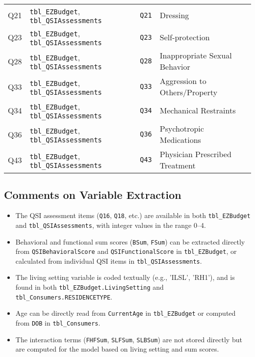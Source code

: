 \begin{center}
\begin{tabular}{|l|l|l|l|}
Q21             & \texttt{tbl\_EZBudget}, \texttt{tbl\_QSIAssessments} & \texttt{Q21}  & Dressing \\
Q23             & \texttt{tbl\_EZBudget}, \texttt{tbl\_QSIAssessments} & \texttt{Q23}  & Self-protection \\
Q28             & \texttt{tbl\_EZBudget}, \texttt{tbl\_QSIAssessments} & \texttt{Q28}  & Inappropriate Sexual Behavior \\
Q33             & \texttt{tbl\_EZBudget}, \texttt{tbl\_QSIAssessments} & \texttt{Q33}  & Aggression to Others/Property \\
Q34             & \texttt{tbl\_EZBudget}, \texttt{tbl\_QSIAssessments} & \texttt{Q34}  & Mechanical Restraints \\
Q36             & \texttt{tbl\_EZBudget}, \texttt{tbl\_QSIAssessments} & \texttt{Q36}  & Psychotropic Medications \\
Q43             & \texttt{tbl\_EZBudget}, \texttt{tbl\_QSIAssessments} & \texttt{Q43}  & Physician Prescribed Treatment \\
\hline
\end{tabular}
\end{center}

\subsection{Comments on Variable Extraction}

\begin{itemize}
    \item The QSI assessment items (\texttt{Q16}, \texttt{Q18}, etc.) are available in both \texttt{tbl\_EZBudget} and \texttt{tbl\_QSIAssessments}, with integer values in the range 0--4.
    \item Behavioral and functional sum scores (\texttt{BSum}, \texttt{FSum}) can be extracted directly from \texttt{QSIBehavioralScore} and \texttt{QSIFunctionalScore} in \texttt{tbl\_EZBudget}, or calculated from individual QSI items in \texttt{tbl\_QSIAssessments}.
    \item The living setting variable is coded textually (e.g., 'ILSL', 'RH1'), and is found in both \texttt{tbl\_EZBudget.LivingSetting} and \texttt{tbl\_Consumers.RESIDENCETYPE}.
    \item Age can be directly read from \texttt{CurrentAge} in \texttt{tbl\_EZBudget} or computed from \texttt{DOB} in \texttt{tbl\_Consumers}.
    \item The interaction terms (\texttt{FHFSum}, \texttt{SLFSum}, \texttt{SLBSum}) are not stored directly but are computed for the model based on living setting and sum scores.
\end{itemize}

